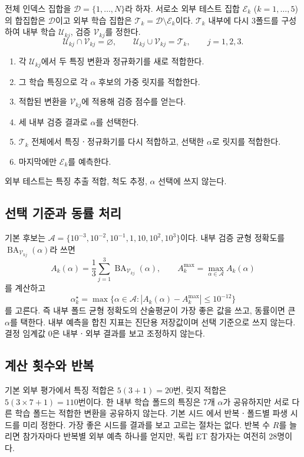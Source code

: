 \documentclass[11pt,a4paper]{article}
\newcommand{\code}[1]{\texttt{\detokenize{#1}}}
\DeclareMathOperator{\BA}{BA}
\numberwithin{equation}{section}
\begin{document}
전체 인덱스 집합을 \(\mathcal D=\{1,\ldots,N\}\)라 하자.
서로소 외부 테스트 집합 \(\mathcal E_k\) (\(k=1,\ldots,5\))의 합집합은
\(\mathcal D\)이고 외부 학습 집합은
\(\mathcal T_k=\mathcal D\setminus\mathcal E_k\)이다.
\(\mathcal T_k\) 내부에 다시 3폴드를 구성하여
내부 학습 \(\mathcal U_{kj}\), 검증 \(\mathcal V_{kj}\)를 정한다.
\begin{equation}
 \mathcal U_{kj}\cap\mathcal V_{kj}=\varnothing,\qquad
 \mathcal U_{kj}\cup\mathcal V_{kj}=\mathcal T_k,\qquad j=1,2,3.
\end{equation}
\begin{enumerate}
\item 각 \(\mathcal U_{kj}\)에서 두 특징 변환과 정규화기를 새로 적합한다.
\item 그 학습 특징으로 각 \(\alpha\) 후보의 가중 릿지를 적합한다.
\item 적합된 변환을 \(\mathcal V_{kj}\)에 적용해 검증 점수를 얻는다.
\item 세 내부 검증 결과로 \(\alpha\)를 선택한다.
\item \(\mathcal T_k\) 전체에서 특징ㆍ정규화기를 다시 적합하고,
 선택한 \(\alpha\)로 릿지를 적합한다.
\item 마지막에만 \(\mathcal E_k\)를 예측한다.
\end{enumerate}
외부 테스트는 특징 추출 적합, 척도 추정, \(\alpha\) 선택에 쓰지 않는다.

\subsection{선택 기준과 동률 처리}
기본 후보는
\(\mathcal A=\{10^{-3},10^{-2},10^{-1},1,10,10^2,10^3\}\)이다.
내부 검증 균형 정확도를 \(\BA_{\mathcal V_{kj}}(\alpha)\)라 쓰면
\begin{equation}
 A_k(\alpha)=\frac13\sum_{j=1}^{3}\BA_{\mathcal V_{kj}}(\alpha),\qquad
 A_k^{\max}=\max_{\alpha\in\mathcal A}A_k(\alpha)
\end{equation}
를 계산하고
\begin{equation}
 \alpha_k^\star=\max\{\alpha\in\mathcal A:
 |A_k(\alpha)-A_k^{\max}|\leq10^{-12}\}
\end{equation}
를 고른다. 즉 내부 폴드 균형 정확도의 산술평균이 가장 좋은 값을 쓰고,
동률이면 큰 \(\alpha\)를 택한다.
내부 예측을 합친 지표는 진단용 저장값이며 선택 기준으로 쓰지 않는다.
결정 임계값 \(0\)은 내부ㆍ외부 결과를 보고 조정하지 않는다.

\subsection{계산 횟수와 반복}
기본 외부 평가에서 특징 적합은 \(5(3+1)=20\)번,
릿지 적합은 \(5(3\times7+1)=110\)번이다.
한 내부 학습 폴드의 특징은 7개 \(\alpha\)가 공유하지만
서로 다른 학습 폴드는 적합한 변환을 공유하지 않는다.
기본 시드 \code{20261017}에서 반복ㆍ폴드별 파생 시드를 미리 정한다.
가장 좋은 시드를 결과를 보고 고르는 절차는 없다.
반복 수 \(R\)를 늘리면 참가자마다 반복별 외부 예측 하나를 얻지만,
독립 ET 참가자는 여전히 28명이다.
\end{document}
